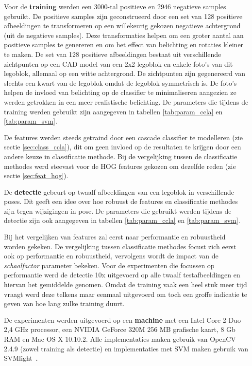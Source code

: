 Voor de \textbf{training} werden een 3000-tal positieve en 2946 negatieve samples gebruikt. De positieve samples zijn geconstrueerd door een set van 128 positieve afbeeldingen te transformeren op een willekeurig gekozen negatieve achtergrond (uit de negatieve samples). Deze transformaties helpen om een groter aantal aan positieve samples te genereren en om het effect van belichting en rotaties kleiner te maken. De set van 128 positieve afbeeldingen bestaat uit verschillende zichtpunten op een CAD model van een 2x2 legoblok en enkele foto's van dit legoblok, allemaal op een witte achtergrond. De zichtpunten zijn gegenereerd van slechts een kwart van de legoblok omdat de legoblok symmetrisch is. De foto's helpen de invloed van belichting op de classifier te minimaliseren aangezien ze werden getrokken in een meer realistische belichting. De parameters die tijdens de training werden gebruikt zijn aangegeven in tabellen \ref{tab:param_ccla} en \ref{tab:param_svm}.

De features werden steeds getraind door een cascade classifier te modelleren (zie sectie \ref{sec:class_ccla}), dit om geen invloed op de resultaten te krijgen door een andere keuze in classificatie methode. Bij de vergelijking tussen de classificatie methodes werd steevast voor de HOG features gekozen om dezelfde reden (zie sectie \ref{sec:feat_hog}).

De \textbf{detectie} gebeurt op twaalf afbeeldingen van een legoblok in verschillende poses. Dit geeft een idee over hoe robuust de features  en classificatie methodes zijn tegen wijzigingen in pose. De parameters die gebruikt werden tijdens de detectie zijn ook aangegeven in tabellen \ref{tab:param_ccla} en \ref{tab:param_svm}.

Bij het vergelijken van features zal eerst naar performantie en robuustheid worden gekeken. De vergelijking tussen classificatie methodes focust zich eerst ook op performantie en robuustheid, vervolgens wordt de impact van de \textit{schaalfactor} parameter bekeken. Voor de experimenten die focussen op performantie werd de detectie 10x uitgevoerd op alle twaalf testafbeeldingen en hiervan het gemiddelde genomen. Omdat de training vaak een heel stuk meer tijd vraagt werd deze telkens maar eenmaal uitgevoerd om toch een groffe indicatie te geven van hoe lang zulke training duurt.

De experimenten werden uitgevoerd op een \textbf{machine} met een Intel Core 2 Duo 2,4 GHz processor, een NVIDIA GeForce 320M 256 MB grafische kaart, 8 Gb RAM en Mac OS X 10.10.2. Alle implementaties maken gebruik van OpenCV 2.4.9 (zowel training als detectie) en implementaties met SVM maken gebruik van SVMlight~\cite{joachims1999svmlight}.

